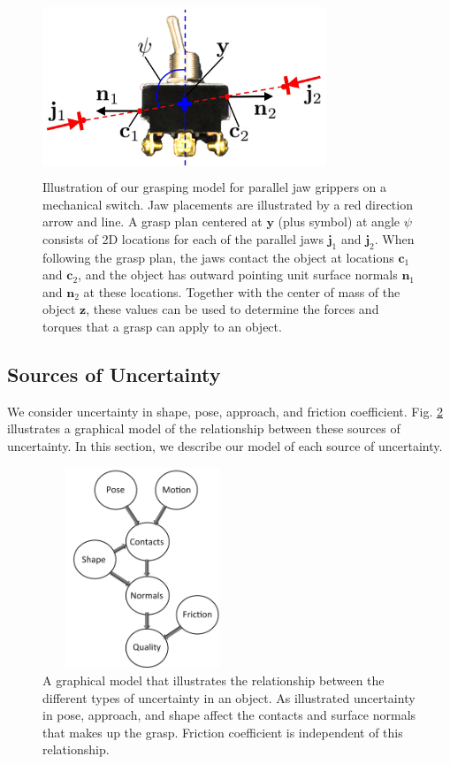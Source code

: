 \documentclass[10pt, conference]{ieeeconf}      %
\newcommand{\bc}{\mathbf{c}}
\newcommand{\bj}{\mathbf{j}}
\newcommand{\bn}{\mathbf{n}}
\newcommand{\by}{\mathbf{y}}
\newcommand{\bz}{\mathbf{z}}
\begin{document}
\begin{figure}[t!]
\centering
\includegraphics[width = 8.5cm, height = 5.25cm]{figures/bandit_grasp_model.jpg}
\caption{Illustration of our grasping model for parallel jaw grippers on a mechanical switch. Jaw placements are illustrated by a red direction arrow and line. A grasp plan centered at $\by$ (plus symbol) at angle $\psi$ consists of 2D locations for each of the parallel jaws $\bj_1$ and $\bj_2$. When following the grasp plan, the jaws contact the object at locations $\bc_1$ and $\bc_2$, and the object has outward pointing unit surface normals $\bn_1$ and $\bn_2$ at these locations. Together with the center of mass of the object $\bz$, these values can be used to determine the forces and torques that a grasp can apply to an object.}
\vspace*{-2ex}
\label{fig:grasp_model}
\end{figure}

\subsection{Sources of Uncertainty}
We consider uncertainty in shape, pose, approach, and friction coefficient.
Fig. \ref{fig:graphical_model} illustrates a graphical model of the relationship between these sources of uncertainty.
In this section, we describe our model of each source of uncertainty.

\begin{figure}[ht!]
\centering
\includegraphics[width = 6cm, height = 6cm]{figures/Graphical_Model.jpg}
\caption{A graphical model that illustrates the relationship between the different types of uncertainty in an object. As illustrated uncertainty in pose, approach, and shape affect the contacts and surface normals that makes up the grasp. Friction coefficient is independent of this relationship.  }
\vspace*{-10pt}
\label{fig:graphical_model}
\end{figure}
\end{document}
